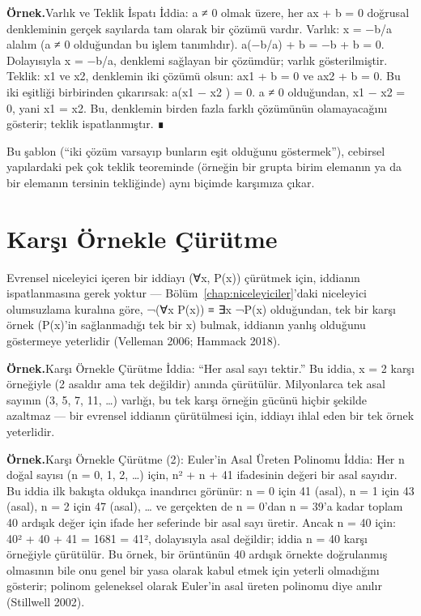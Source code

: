 \begin{tcolorbox}[bookbox,colback=cEx]\textbf{\textsf{\textcolor{cAcc}{Örnek.}}}\quad Varlık ve Teklik İspatı İddia: a ≠ 0 olmak üzere, her ax + b = 0 doğrusal denkleminin gerçek sayılarda tam olarak bir çözümü vardır. Varlık: x = −b/a alalım (a ≠ 0 olduğundan bu işlem tanımlıdır). a(−b/a) + b = −b + b = 0. Dolayısıyla x = −b/a, denklemi sağlayan bir çözümdür; varlık gösterilmiştir. Teklik: x1 ve x2, denklemin iki çözümü olsun: ax1 + b = 0 ve ax2 + b = 0. Bu iki eşitliği birbirinden çıkarırsak: a(x1 − x2 ) = 0. a ≠ 0 olduğundan, x1 − x2 = 0, yani x1 = x2. Bu, denklemin birden fazla farklı çözümünün olamayacağını gösterir; teklik ispatlanmıştır. ∎\end{tcolorbox}

Bu şablon (“iki çözüm varsayıp bunların eşit olduğunu göstermek”), cebirsel yapılardaki pek çok teklik teoreminde (örneğin bir grupta birim elemanın ya da bir elemanın tersinin tekliğinde) aynı biçimde karşımıza çıkar.

\section{Karşı Örnekle Çürütme}

Evrensel niceleyici içeren bir iddiayı (∀x, P(x)) çürütmek için, iddianın ispatlanmasına gerek yoktur — Bölüm~\ref{chap:niceleyiciler}’daki niceleyici olumsuzlama kuralına göre, ¬(∀x P(x)) ≡ ∃x ¬P(x) olduğundan, tek bir karşı örnek (P(x)’in sağlanmadığı tek bir x) bulmak, iddianın yanlış olduğunu göstermeye yeterlidir (Velleman 2006; Hammack 2018).

\begin{tcolorbox}[bookbox,colback=cEx]\textbf{\textsf{\textcolor{cAcc}{Örnek.}}}\quad Karşı Örnekle Çürütme İddia: “Her asal sayı tektir.” Bu iddia, x = 2 karşı örneğiyle (2 asaldır ama tek değildir) anında çürütülür. Milyonlarca tek asal sayının (3, 5, 7, 11, …) varlığı, bu tek karşı örneğin gücünü hiçbir şekilde azaltmaz — bir evrensel iddianın çürütülmesi için, iddiayı ihlal eden bir tek örnek yeterlidir.\end{tcolorbox}

\begin{tcolorbox}[bookbox,colback=cEx]\textbf{\textsf{\textcolor{cAcc}{Örnek.}}}\quad Karşı Örnekle Çürütme (2): Euler’in Asal Üreten Polinomu İddia: Her n doğal sayısı (n = 0, 1, 2, …) için, n² + n + 41 ifadesinin değeri bir asal sayıdır. Bu iddia ilk bakışta oldukça inandırıcı görünür: n = 0 için 41 (asal), n = 1 için 43 (asal), n = 2 için 47 (asal), … ve gerçekten de n = 0’dan n = 39’a kadar toplam 40 ardışık değer için ifade her seferinde bir asal sayı üretir. Ancak n = 40 için: 40² + 40 + 41 = 1681 = 41², dolayısıyla asal değildir; iddia n = 40 karşı örneğiyle çürütülür. Bu örnek, bir örüntünün 40 ardışık örnekte doğrulanmış olmasının bile onu genel bir yasa olarak kabul etmek için yeterli olmadığını gösterir; polinom geleneksel olarak Euler’in asal üreten polinomu diye anılır (Stillwell 2002).\end{tcolorbox}

